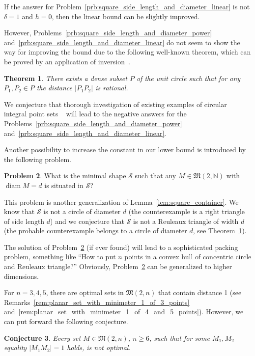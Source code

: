 \documentclass[a4paper,14pt]{article} %
\theoremstyle{plain}
\newtheorem{theorem}{Theorem}[section]
\newtheorem{conjecture}[theorem]{Conjecture}
\theoremstyle{definition}
\newtheorem{problem}[theorem]{Problem}
\begin{document}
If the answer for Problem~\ref{prb:square_side_length_and_diameter_linear} is not $\delta = 1$ and $h = 0$,
then the linear bound can be slightly improved.

However, Problems~\ref{prb:square_side_length_and_diameter_power} and~\ref{prb:square_side_length_and_diameter_linear}
do not seem to show the way for improving the bound
due to the following well-known theorem,
which can be proved by an application of inversion~\cite{solymosi2010question}.
\begin{theorem}
	\label{thm:rational_set_on_circle}
	There exists a dense subset $P$ of the unit circle such that for any $P_1, P_2 \in P$
	the distance $|P_1 P_2|$ is rational.
\end{theorem}
We conjecture that thorough investigation of existing examples of circular integral point sets
~\cite{bat2018number,harborth1993upper,piepmeyer1996maximum}
will lead to the negative answers for the
Problems~\ref{prb:square_side_length_and_diameter_power} and~\ref{prb:square_side_length_and_diameter_linear}.

Another possibility to increase the constant in our lower bound is introduced by the following problem.

\begin{problem}
	\label{prb:minimal_shape}
	What is the minimal shape $\mathcal{S}$ such that any $M\in\mathfrak{M}(2,\mathbb{N})$ with $\operatorname{diam} M = d$
	is situated in  $\mathcal{S}$?
\end{problem}
This problem is another generalization of Lemma~\ref{lem:square_container}.
We know that $\mathcal{S}$ is not a circle of diameter $d$
(the counterexample is a right triangle of side length $d$)
and we conjecture that $\mathcal{S}$ is not a Reuleaux triangle of width $d$
(the probable counterexample belongs to a circle of diameter $d$, see Theorem~\ref{thm:rational_set_on_circle}).

The solution of Problem~\ref{prb:minimal_shape} (if ever found) will lead to a sophisticated packing problem,
something like ``How to put $n$ points in a convex hull of concentric circle and Reuleaux triangle?''
Obviously, Problem~\ref{prb:minimal_shape} can be generalized to higher dimensions.


For $n=3,4,5$, there are optimal sets in $\mathfrak{M}(2,n)$ that contain distance 1
(see Remarks~\ref{rem:planar_set_with_minimeter_1_of_3_points} and~\ref{rem:planar_set_with_minimeter_1_of_4_and_5_points}).
However, we can put forward the following conjecture.
\begin{conjecture}
	\label{con:no_optimal_with_edge_1}
	Every set $M\in\mathfrak{M}(2,n)$, $n\geq 6$, such that for some $M_1,M_2$ equality $|M_1 M_2|=1$ holds,
	is not optimal.
\end{conjecture}
\end{document}
